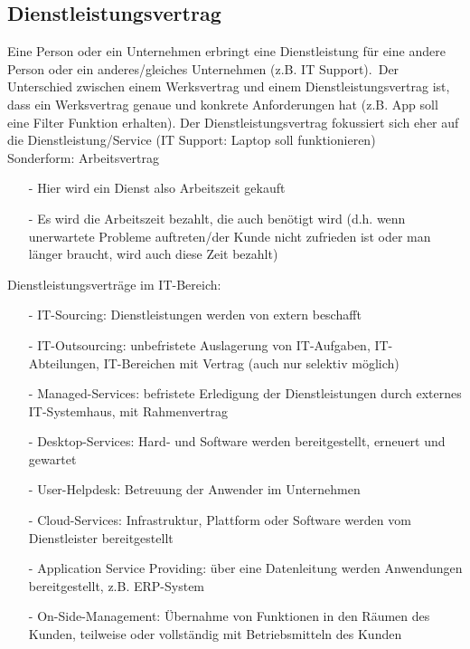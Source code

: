 \documentclass[10pt]{article}
\begin{document}
\subsection{Dienstleistungsvertrag} Eine Person oder ein Unternehmen erbringt eine Dienstleistung für eine andere Person oder ein anderes/gleiches Unternehmen (z.B. IT Support).\
Der Unterschied zwischen einem Werksvertrag und einem Dienstleistungsvertrag ist, dass ein Werksvertrag genaue und konkrete Anforderungen hat (z.B. App soll eine Filter Funktion erhalten). Der Dienstleistungsvertrag fokussiert sich eher auf die Dienstleistung/Service (IT Support: Laptop soll funktionieren)\\
Sonderform: Arbeitsvertrag
\begin{itemize}
    \item[-] Hier wird ein Dienst also Arbeitszeit gekauft
    \item[-]Es wird die Arbeitszeit bezahlt, die auch benötigt wird (d.h. wenn unerwartete Probleme auftreten/der Kunde nicht zufrieden ist oder man länger braucht, wird auch diese Zeit bezahlt)
\end{itemize}

Dienstleistungsverträge im IT-Bereich:\
\begin{itemize}
\item[-]IT-Sourcing: Dienstleistungen werden von extern beschafft
\item[-]IT-Outsourcing: unbefristete Auslagerung von IT-Aufgaben, IT-Abteilungen, IT-Bereichen mit Vertrag (auch nur selektiv möglich)
\item[-]Managed-Services: befristete Erledigung der Dienstleistungen durch externes IT-Systemhaus, mit Rahmenvertrag
\item[-]Desktop-Services: Hard- und Software werden bereitgestellt, erneuert und gewartet
\item[-]User-Helpdesk: Betreuung der Anwender im Unternehmen
\item[-]Cloud-Services: Infrastruktur, Plattform oder Software werden vom Dienstleister bereitgestellt
\item[-]Application Service Providing: über eine Datenleitung werden Anwendungen bereitgestellt, z.B. ERP-System
\item[-]On-Side-Management: Übernahme von Funktionen in den Räumen des Kunden, teilweise oder vollständig mit Betriebsmitteln des Kunden
\end{itemize}

\break
\end{document}
